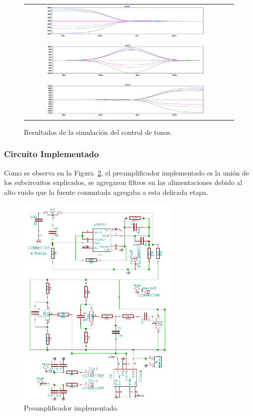 \begin{figure}[H]
\centering
\begin{tabular}{cc}
\includegraphics[width=0.8\textwidth]{img/tonos_sim_1.png}\\
\\
\includegraphics[width=0.8\textwidth]{img/tonos_sim_2.png}\\
\\
\includegraphics[width=0.8\textwidth]{img/tonos_sim_3.png}
\end{tabular}
\caption{Resultados de la simulación del control de tonos.}
\label{tonos_sim} 
\end{figure}
\medskip
\subsubsection{Circuito Implementado}

Como se observa en la Figura~\ref{pre_cir}, el preamplificador implementado es la unión de los subcircuitos explicados, se agregaron filtros en las alimentaciones debido al alto ruido que la fuente conmutada agregaba a esta delicada etapa.

\begin{figure}[ht]
\centering
\includegraphics[width=0.7\textwidth]{img/pre_cir.png}
\caption{Preamplificador implementado.}
\label{pre_cir} 
\end{figure}
\medskip